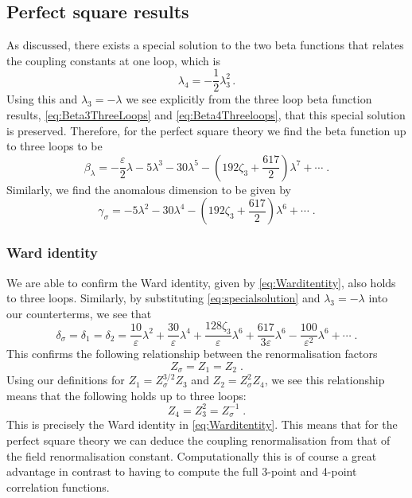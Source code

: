 \documentclass[a4paper,11pt]{article}
\begin{document}
\subsection{Perfect square results}
\label{sec:specialline}

As discussed, there exists a special solution to the two beta functions that relates the coupling constants at one loop, which is
\begin{equation}\label{eq:specialsolution}
    \lambda_4 = -\frac12 \lambda_3^2\,.
\end{equation} 
Using this and $\lambda_3 = -\lambda$ we see explicitly from the three loop beta function results, \cref{eq:Beta3ThreeLoops} and \cref{eq:Beta4Threeloops}, that this special solution is preserved. Therefore, for the perfect square theory we find the beta function up to three loops to be 
\begin{equation}\label{eq:BetaThreeloopPS}
    \beta_\lambda = -\frac{\varepsilon}{2}\lambda - 5\lambda^3   - 30\lambda^5 - \left(192 \zeta_3 +  \frac{617}{2}\right)\lambda^7 + \cdots \;.
\end{equation}
Similarly, we find the anomalous dimension to be given by 
\begin{equation}\label{eq:AnomThreeloopPS}
    \gamma_\sigma =  -5\lambda^2   -  30\lambda^4 - \left(192 \zeta_3 +  \frac{617}{2}\right)\lambda^6 + \cdots \;.
\end{equation}

\subsubsection{Ward identity}
We are able to confirm the Ward identity, given by \cref{eq:Warditentity}, also holds to three loops. Similarly, by substituting \cref{eq:specialsolution} and $\lambda_3 = -\lambda$ into our counterterms, we see that
\begin{equation}\label{eq:threeloopresult}
 \delta_\sigma = \delta_1 =\delta_2   = \frac{10}{\varepsilon} \lambda^2 + \frac{30}{\varepsilon} \lambda^4 + \frac{128\zeta_3}{\varepsilon}\lambda^6 + \frac{617}{3\varepsilon}\lambda^6 - \frac{100}{\varepsilon^2}\lambda^6 + \cdots \;.
\end{equation}
This confirms the following relationship between the renormalisation factors
\begin{equation}\label{eq:Zphi=Z_1=Z-2}
    Z_\sigma = Z_1 =Z_2  \;.
\end{equation}
Using our definitions for $Z_1 = Z_\sigma^{3/2}Z_{3}$ and $ Z_2 =Z_\sigma^2 Z_{4}$, we see this relationship means that the following holds up to three loops:
\begin{equation}\label{eq:Z_4 = Z^2_3}
     Z_{4}  =  Z^2_3 = Z_\sigma^{-1} \;.
\end{equation}
This is precisely the Ward identity in \cref{eq:Warditentity}. This means that for the perfect square theory we can deduce the coupling renormalisation from that of the field renormalisation constant. Computationally this is of course a great advantage in contrast to having to compute the full 3-point and 4-point correlation functions. 
\end{document}

